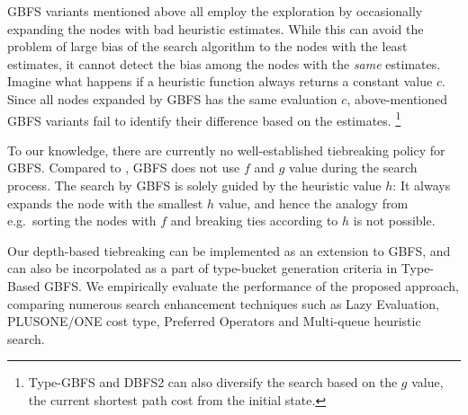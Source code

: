 GBFS variants mentioned above all employ the exploration by occasionally
expanding the nodes with bad heuristic estimates. While this can avoid
the problem of large bias of the search algorithm to the nodes with the
least estimates, it cannot detect the bias among the nodes with the
\emph{same} estimates. Imagine what happens if a heuristic function
always returns a constant value $c$. Since all nodes expanded by GBFS
has the same evaluation $c$, above-mentioned GBFS variants fail to
identify their difference based on the estimates. \footnote{Type-GBFS
and DBFS2 can also diversify the search based on the $g$ value, the
current shortest path cost from the initial state.}

To our knowledge, there are currently no well-established tiebreaking
policy for GBFS.  Compared to \astar, GBFS does not use $f$ and $g$
value during the search process.  The search by GBFS is solely guided by
the heuristic value $h$: It always expands the node with the smallest
$h$ value, and hence the analogy from \astar e.g.\ sorting the nodes
with $f$ and breaking ties according to $h$ is not possible.

Our depth-based tiebreaking can be implemented as an extension to GBFS, and
can also be incorpolated as a part of type-bucket generation criteria in
Type-Based GBFS.  We empirically evaluate the performance of the
proposed approach, comparing numerous search enhancement techniques such
as Lazy Evaluation, PLUS\-ONE/ONE cost type, Preferred Operators and
Multi-queue heuristic search.
